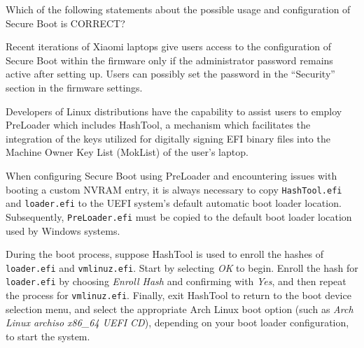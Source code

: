 \documentclass{exam-zh}
\begin{document}
\begin{question}
  Which of the following statements about the possible usage and configuration of Secure Boot is CORRECT?

  \begin{choices}
  \item Recent iterations of Xiaomi laptops give users access to the configuration of Secure Boot within the firmware only if the administrator password remains active after setting up. Users can possibly set the password in the ``Security'' section in the firmware settings.

  \item Developers of Linux distributions have the capability to assist users to employ PreLoader which includes HashTool, a mechanism which facilitates the integration of the keys utilized for digitally signing EFI binary files into the Machine Owner Key List (MokList) of the user's laptop.

  \item When configuring Secure Boot using PreLoader and encountering issues with booting a custom NVRAM entry, it is always necessary to copy \texttt{HashTool.efi} and \texttt{loader.efi} to the UEFI system's default automatic boot loader location. Subsequently, \texttt{PreLoader.efi} must be copied to the default boot loader location used by Windows systems.

  \item During the boot process, suppose HashTool is used to enroll the hashes of \texttt{loader.efi} and \texttt{vmlinuz.efi}. Start by selecting \textit{OK} to begin. Enroll the hash for \texttt{loader.efi} by choosing \textit{Enroll Hash} and confirming with \textit{Yes}, and then repeat the process for \texttt{vmlinuz.efi}. Finally, exit HashTool to return to the boot device selection menu, and select the appropriate Arch Linux boot option (such as \textit{Arch Linux archiso x86\_64 UEFI CD}), depending on your boot loader configuration, to start the system.
  \end{choices}
\end{question}
\end{document}
